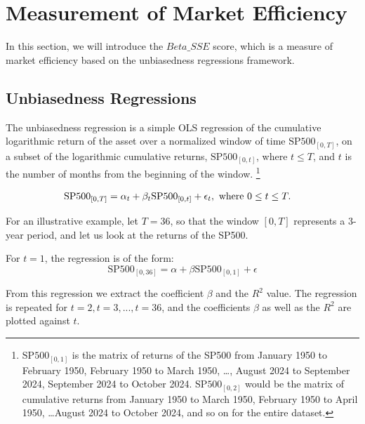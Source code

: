 \section{Measurement of Market Efficiency}
\label{sec:market_efficiency}

In this section, we will introduce the $Beta\_SSE$ score, which is a measure of market efficiency based on the unbiasedness regressions framework.

\subsection{Unbiasedness Regressions}

\noindent The unbiasedness regression is a simple OLS regression of the cumulative logarithmic return of the asset over a normalized window of time $\mathrm{SP500}_{[0, T]}$, on a subset of the
logarithmic cumulative returns, $\mathrm{SP500}_{[0, t]}$, where $t \leq T$, and $t$ is the number of months from the beginning of the window.
 \footnote{$\mathrm{SP500}_{[0, 1]}$ is the matrix of returns of the SP500 from January 1950 to February 1950, February 1950 to March 1950, \dots, August 2024 to September 2024, September 2024 to October 2024.\newline
$\mathrm{SP500}_{[0, 2]}$ would be the matrix of cumulative returns from January 1950 to March 1950, February 1950 to April 1950, \dots August 2024 to October 2024, and so on for the entire dataset.}

\begin{equation}
    \begin{aligned}
        \mathrm{SP500}_{[0, T]} &= \alpha_t + \beta_t \mathrm{SP500}_{[0, t]} + \epsilon_{t}, \hfill \text{   where } 0 \leq t \leq T.
    \end{aligned}
\end{equation}

\noindent For an illustrative example, let $T = 36$, so that the window $[0, T]$ represents a 3-year period, and let us look at the returns of the SP500.

\noindent For $t=1$, the regression is of the form:
\begin{equation}
    \mathrm{SP500}_{[0, 36]} = \alpha + \beta \mathrm{SP500}_{[0, 1]} + \epsilon
\end{equation}

\noindent From this regression we extract the coefficient $\beta$ and the $R^2$ value.
The regression is repeated for $t=2, t=3, ..., t=36$, and the coefficients $\beta$ as well as the $R^2$ are plotted against $t$.

